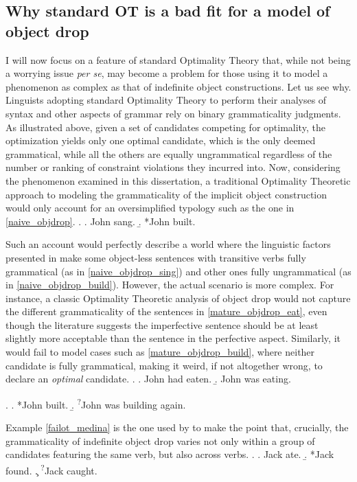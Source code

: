 \subsection{Why standard OT is a bad fit for a model of object drop} 
I will now focus on a feature of standard Optimality Theory that, while not being a worrying issue \textit{per se}, may become a problem for those using it to model a phenomenon as complex as that of indefinite object constructions. Let us see why.\\
Linguists adopting standard Optimality Theory to perform their analyses of syntax and other aspects of grammar rely on binary grammaticality judgments. As illustrated above, given a set of candidates competing for optimality, the optimization yields only one optimal candidate, which is the only deemed grammatical, while all the others are equally ungrammatical regardless of the number or ranking of constraint violations they incurred into. Now, considering the phenomenon examined in this dissertation, a traditional Optimality Theoretic approach to modeling the grammaticality of the implicit object construction would only account for an oversimplified typology such as the one in \ref{naive_objdrop}. 
\ex. \label{naive_objdrop} \a. \label{naive_objdrop_sing} John sang.
\b. \label{naive_objdrop_build} *John built.

Such an account would perfectly describe a world where the linguistic factors presented in  make some object-less sentences with transitive verbs fully grammatical (as in \ref{naive_objdrop_sing}) and other ones fully ungrammatical (as in \ref{naive_objdrop_build}). However, the actual scenario is more complex. For instance, a classic Optimality Theoretic analysis of object drop would not capture the different grammaticality of the sentences in \ref{mature_objdrop_eat}, even though the literature suggests the imperfective sentence should be at least slightly more acceptable than the sentence in the perfective aspect. Similarly, it would fail to model cases such as \ref{mature_objdrop_build}, where neither candidate is fully grammatical, making it weird, if not altogether wrong, to declare an \textit{optimal} candidate.
\ex. \label{mature_objdrop_eat} \a. John had eaten.
\b. John was eating.

\ex. \label{mature_objdrop_build} \a. *John built.
\b. \textsuperscript{?}John was building again.

Example \ref{failot_medina} is the one used by \textcite[62]{Medina2007} to make the point that, crucially, the grammaticality of indefinite object drop varies not only within a group of candidates featuring the same verb, but also across verbs.
\ex. \label{failot_medina} \a. Jack ate.
\b. *Jack found.
\c. \textsuperscript{?}Jack caught.

